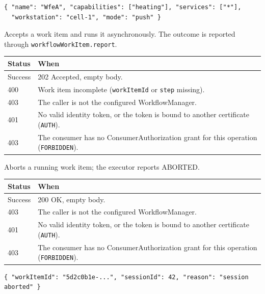 \documentclass[a4paper]{arrowhead}
\begin{document}
\begin{lstlisting}[caption={Example response body}]
{ "name": "WfeA", "capabilities": ["heating"], "services": ["*"],
  "workstation": "cell-1", "mode": "push" }
\end{lstlisting}

Accepts a work item and runs it asynchronously. The outcome is reported through \texttt{workflowWorkItem.report}.

{\small
\begin{longtable}{|p{2.0cm}|p{13.8cm}|}

\hline
\rowcolor{gray!33} Status & When \\ \hline
\endhead
Success & 202 Accepted, empty body. \\ \hline
400 & Work item incomplete (\texttt{workItemId} or \texttt{step} missing). \\ \hline
403 & The caller is not the configured WorkflowManager. \\ \hline
401 & No valid identity token, or the token is bound to another certificate (\texttt{AUTH}). \\ \hline
403 & The consumer has no ConsumerAuthorization grant for this operation (\texttt{FORBIDDEN}). \\ \hline
\end{longtable}
}

Aborts a running work item; the executor reports ABORTED.

{\small
\begin{longtable}{|p{2.0cm}|p{13.8cm}|}

\hline
\rowcolor{gray!33} Status & When \\ \hline
\endhead
Success & 200 OK, empty body. \\ \hline
403 & The caller is not the configured WorkflowManager. \\ \hline
401 & No valid identity token, or the token is bound to another certificate (\texttt{AUTH}). \\ \hline
403 & The consumer has no ConsumerAuthorization grant for this operation (\texttt{FORBIDDEN}). \\ \hline
\end{longtable}
}


\begin{lstlisting}[caption={Example request body}]
{ "workItemId": "5d2c0b1e-...", "sessionId": 42, "reason": "session aborted" }
\end{lstlisting}
\end{document}
